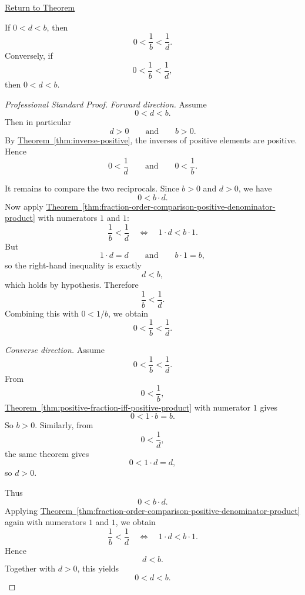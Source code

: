 \newpage
{}
\label{prf:reciprocal-order-for-positive-elements}

\begin{remark*}[Return]
\hyperref[thm:reciprocal-order-for-positive-elements]{Return to Theorem}
\end{remark*}

\begin{theorem*}
If $0<d<b$, then
\[
0<\frac{1}{b}<\frac{1}{d}.
\]
Conversely, if
\[
0<\frac{1}{b}<\frac{1}{d},
\]
then $0<d<b$.
\end{theorem*}

\begin{proof}[Professional Standard Proof]
\LRAProofBodyStart
\emph{Forward direction.} Assume
\[
0<d<b.
\]
Then in particular
\[
d>0
\qquad\text{and}\qquad
b>0.
\]
By \hyperref[thm:inverse-positive]{Theorem~\ref*{thm:inverse-positive}},
the inverses of positive elements are positive.  Hence
\[
0<\frac{1}{d}
\qquad\text{and}\qquad
0<\frac{1}{b}.
\]

It remains to compare the two reciprocals.  Since $b>0$ and $d>0$, we have
\[
0<b\cdot d.
\]
Now apply
\hyperref[thm:fraction-order-comparison-positive-denominator-product]{Theorem~\ref*{thm:fraction-order-comparison-positive-denominator-product}}
with numerators $1$ and $1$:
\[
\frac{1}{b}<\frac{1}{d}
\quad\Longleftrightarrow\quad
1\cdot d<b\cdot 1.
\]
But
\[
1\cdot d=d
\qquad\text{and}\qquad
b\cdot 1=b,
\]
so the right-hand inequality is exactly
\[
d<b,
\]
which holds by hypothesis.  Therefore
\[
\frac{1}{b}<\frac{1}{d}.
\]
Combining this with $0<1/b$, we obtain
\[
0<\frac{1}{b}<\frac{1}{d}.
\]

\emph{Converse direction.} Assume
\[
0<\frac{1}{b}<\frac{1}{d}.
\]
From
\[
0<\frac{1}{b},
\]
\hyperref[thm:positive-fraction-iff-positive-product]{Theorem~\ref*{thm:positive-fraction-iff-positive-product}}
with numerator $1$ gives
\[
0<1\cdot b=b.
\]
So $b>0$.  Similarly, from
\[
0<\frac{1}{d},
\]
the same theorem gives
\[
0<1\cdot d=d,
\]
so $d>0$.

Thus
\[
0<b\cdot d.
\]
Applying
\hyperref[thm:fraction-order-comparison-positive-denominator-product]{Theorem~\ref*{thm:fraction-order-comparison-positive-denominator-product}}
again with numerators $1$ and $1$, we obtain
\[
\frac{1}{b}<\frac{1}{d}
\quad\Longleftrightarrow\quad
1\cdot d<b\cdot 1.
\]
Hence
\[
d<b.
\]
Together with $d>0$, this yields
\[
0<d<b.
\]
\end{proof}

